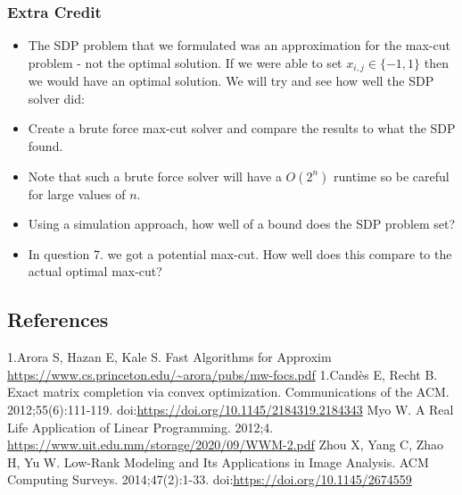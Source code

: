 \documentclass{article}
\begin{document}
\subsubsection{Extra Credit}
\begin{itemize}
\item\label{item:1} The SDP problem that we formulated was an approximation for the max-cut problem - not the optimal solution. If we were able to set \( x_{i, j} \in \{ -1, 1 \} \) then we would have an optimal solution. We will try and see how well the SDP solver did:
\item\label{item:2}
Create a brute force max-cut solver and compare the results to what the SDP found.
\item\label{item:3}
Note that such a brute force solver will have a \( O(2^n) \) runtime so be careful for large values of \( n \).
\item\label{item:4}
Using a simulation approach, how well of a bound does the SDP problem set?
\item\label{item:5}
In question 7. we got a potential max-cut. How well does this compare to the actual optimal max-cut?
\end{itemize}



\newpage
\subsection{References}
\begin{thebibliography}{12}
 1.Arora S, Hazan E, Kale S. Fast Algorithms for Approxim \url{https://www.cs.princeton.edu/~arora/pubs/mw-focs.pdf}
 1.Candès E, Recht B. Exact matrix completion via convex optimization. Communications of the ACM. 2012;55(6):111-119. doi:\url{https://doi.org/10.1145/2184319.2184343}
 Myo W. A Real Life Application of Linear Programming. 2012;4. \url{https://www.uit.edu.mm/storage/2020/09/WWM-2.pdf}
 Zhou X, Yang C, Zhao H, Yu W. Low-Rank Modeling and Its Applications in Image Analysis. ACM Computing Surveys. 2014;47(2):1-33. doi:\url{https://doi.org/10.1145/2674559}
‌
\end{thebibliography}
\end{document}
